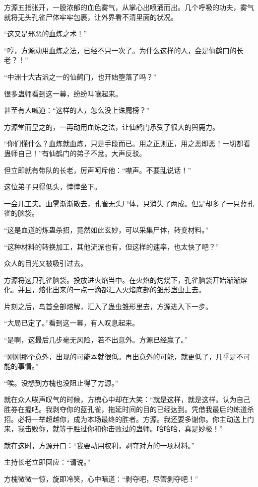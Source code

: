 \begin{this_body}
方源五指张开，一股浓郁的血色雾气，从掌心出喷涌而出。几个呼吸的功夫，雾气就将无头孔雀尸体牢牢包裹，让外界看不清里面的状况。

“这又是邪恶的血炼之术！”

“哼，方源动用血炼之法，已经不只一次了。为什么这样的人，会是仙鹤门的长老？！”

“中洲十大古派之一的仙鹤门，也开始堕落了吗？”

很多蛊师看到这一幕，纷纷叫嚷起来。

甚至有人喊道：“这样的人，怎么没上诛魔榜？”

方源堂而皇之的，一再动用血炼之法，让仙鹤门承受了很大的舆鹿力。

“你们懂什么？血炼就血炼，只是手段而已。用之正则正，用之恶即恶！一切都看蛊师自己！”有仙鹤门的弟子不忿。大声反驳。

但立即就有带队的长老，厉声呵斥他：“噤声。不要乱说话！”

这位弟子只得低头，悻悻坐下。

一会儿工夫。血雾渐渐散去，孔雀无头尸体，只消失了两成。但是却多了一只蓝孔雀的脑袋。

“这是血道的炼蛊杀招，竟然如此玄妙，可以采集尸体，转变材料。”

“这种材料的转换加工，其他流派也有，但这样的速率，也太快了吧？”

众人的目光又被吸引过去。

方源将这只孔雀脑袋。投放进火焰当中。在火焰的灼烧下，孔雀脑袋开始渐渐熔化。并且，熔化出来的一点一滴都汇入火焰底部的雏形蛊虫上去。

片刻之后，鸟首全部熔解，汇入了蛊虫雏形里去，方源进入下一步。

“大局已定了。”看到这一幕，有人叹息起来。

“是啊，这最后几步毫无风险，若不出意外。方源已经赢了。”

“刚刚那个意外，出现的可能本就很低。再出意外的可能，就更低了，几乎是不可能的事情。”

“唉。没想到方槐也没阻止得了方源。”

就在众人唉声叹气的时候，方槐心中却在大笑：“就是这样，就是这样。认为自己胜券在握吧。我剥夺你的蓝孔雀，拖延时间的目的已经达到。凭借我最后的炼道杀招。必将一举超越你，成为本场最终的胜者。方源。我还要多谢你。你主动送上门来，我击败你，就等于胜过你和你击败过的蛊师。哈哈哈，真是妙极！”

就在这时，方源开口：“我要动用权利，剥夺对方的一项材料。”

主持长老立即回应：“请说。”

方槐微微一惊，旋即冷笑，心中暗道：“剥夺吧，尽管剥夺吧！”


\end{this_body}
